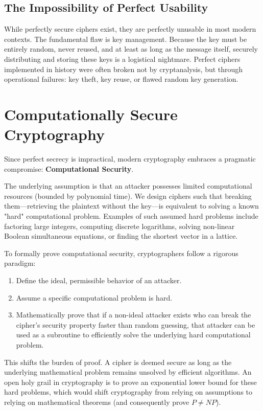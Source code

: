 \subsection{The Impossibility of Perfect Usability}
While perfectly secure ciphers exist, they are perfectly unusable in most modern contexts. The fundamental flaw is key management. Because the key must be entirely random, never reused, and at least as long as the message itself, securely distributing and storing these keys is a logistical nightmare. Perfect ciphers implemented in history were often broken not by cryptanalysis, but through operational failures: key theft, key reuse, or flawed random key generation.

\section{Computationally Secure Cryptography}

Since perfect secrecy is impractical, modern cryptography embraces a pragmatic compromise: \textbf{Computational Security}. 

The underlying assumption is that an attacker possesses limited computational resources (bounded by polynomial time). We design ciphers such that breaking them—retrieving the plaintext without the key—is equivalent to solving a known "hard" computational problem. Examples of such assumed hard problems include factoring large integers, computing discrete logarithms, solving non-linear Boolean simultaneous equations, or finding the shortest vector in a lattice.

To formally prove computational security, cryptographers follow a rigorous paradigm:
\begin{enumerate}
    \item Define the ideal, permissible behavior of an attacker.
    \item Assume a specific computational problem is hard.
    \item Mathematically prove that if a non-ideal attacker exists who can break the cipher's security property faster than random guessing, that attacker can be used as a subroutine to efficiently solve the underlying hard computational problem.
\end{enumerate}
This shifts the burden of proof. A cipher is deemed secure as long as the underlying mathematical problem remains unsolved by efficient algorithms. An open holy grail in cryptography is to prove an exponential lower bound for these hard problems, which would shift cryptography from relying on assumptions to relying on mathematical theorems (and consequently prove $P \neq NP$).

